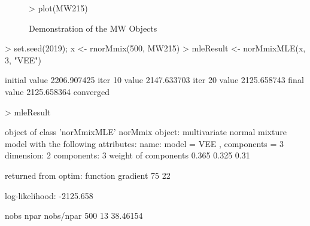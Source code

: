 
\begin{figure}
    \centering
\begin{Schunk}
\begin{Sinput}
>     plot(MW215)
\end{Sinput}
\end{Schunk}
    \caption{Demonstration of the MW Objects}
    \label{fig:demoMW}
\end{figure}

\begin{Schunk}
\begin{Sinput}
>     set.seed(2019); x <- rnorMmix(500, MW215)
>     mleResult <- norMmixMLE(x, 3, "VEE")
\end{Sinput}
\begin{Soutput}
initial  value 2206.907425 
iter  10 value 2147.633703
iter  20 value 2125.658743
final  value 2125.658364 
converged
\end{Soutput}
\begin{Sinput}
>     mleResult
\end{Sinput}
\begin{Soutput}
object of class 'norMmixMLE' 
norMmix object: 
multivariate normal mixture model with the following attributes:
name: 		 model = VEE , components = 3 
 dimension:	 2 
 components:	 3 
weight of components 0.365 0.325 0.31 

returned from optim:
function gradient 
      75       22 

log-likelihood: -2125.658 
 
 nobs	npar	nobs/npar
 500 	 13 	 38.46154 
\end{Soutput}
\end{Schunk}

